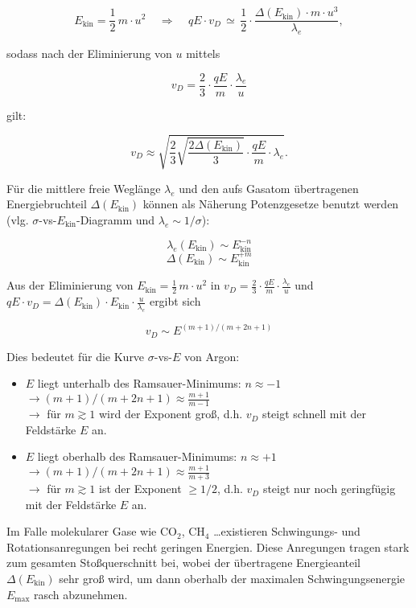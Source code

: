 \[ E_\text{kin} = \frac{1}{2}\, m \cdot u^2 ~~~~~\Rightarrow ~~~~~ qE\cdot v_D\, \simeq\,
\frac{1}{2}\cdot \frac{\Delta(E_\text{kin})\cdot m\cdot u^3}{\lambda_e} , \]

sodass nach der Eliminierung von $u$ mittels

\[v_D = \frac{2}{3} \cdot \frac{qE}{m}\cdot \frac{\lambda_e}{u} \]

gilt:

\[v_D \approx \sqrt{\frac{2}{3}\sqrt{\frac{2\Delta(E_\text{kin})}{3}}\cdot
\frac{qE}{m}\cdot\lambda_e}.
\]

Für die mittlere freie Weglänge $\lambda_e$ und den aufs Gasatom übertragenen Energiebruchteil
$\Delta(E_\text{kin})$ können als Näherung Potenzgesetze benutzt werden (vlg.
$\sigma$-vs-$E_\text{kin}$-Diagramm und $\lambda_e\sim1/\sigma$):

\[\lambda_e(E_\text{kin})\sim E_\text{kin}^{-n}  \]
\[\Delta(E_\text{kin})\sim E_\text{kin}^{+m} \]

Aus der Eliminierung von $E_\text{kin}=\frac{1}{2}\,m\cdot u^2$ in $v_D = \frac{2}{3} \cdot
\frac{qE}{m}\cdot \frac{\lambda_e}{u}$ und $qE\cdot v_D = \Delta(E_\text{kin})\cdot
E_\text{kin}\cdot \frac{u}{\lambda_e}$ ergibt sich

\[v_D \sim E ^{(m+1)/(m+2n+1)}  \]

Dies bedeutet für die Kurve $\sigma$-vs-$E$ von Argon:

\begin{itemize}
  \item $E$ liegt unterhalb des Ramsauer-Minimums: $n\approx -1$\\
  $\rightarrow (m+1)/(m+2n+1)\approx \frac{m+1}{m-1}$\\
  $\rightarrow$ für $m\gtrsim 1$ wird der Exponent groß, d.h. $v_D$ steigt schnell mit der
  Feldstärke $E$ an.
  \item $E$ liegt oberhalb des Ramsauer-Minimums: $n\approx +1$\\
  $\rightarrow (m+1)/(m+2n+1)\approx \frac{m+1}{m+3}$\\
  $\rightarrow$ für $m\gtrsim 1$ ist der Exponent $\ge1/2$, d.h. $v_D$ steigt nur noch geringfügig
  mit der Feldstärke $E$ an.
\end{itemize}

Im Falle molekularer Gase wie CO$_2$, CH$_4$ \ldots existieren Schwingungs- und Rotationsanregungen
bei recht geringen Energien. Diese Anregungen tragen stark zum gesamten Stoßquerschnitt bei, wobei
der übertragene Energieanteil $\Delta(E_\text{kin})$ sehr groß wird, um dann oberhalb der maximalen
Schwingungsenergie $E_\text{max}$ rasch abzunehmen.

